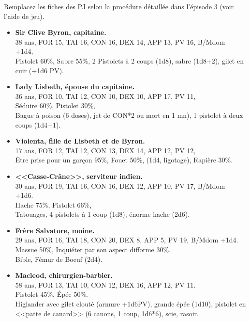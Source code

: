 \documentclass[11pt,twoside,a4paper]{book}
\begin{document}
Remplacez les fiches des PJ selon la proc{\'e}dure d{\'e}taill{\'e}e dans l'{\'e}pisode 3 (voir l'aide de jeu).~\\
\setlength\parindent{20pt}
\begin{itemize}
	\item \textbf{Sir Clive Byron, capitaine. }~\\
	38 ans, FOR 15, TAI 16, CON 16, DEX 14, APP 13, PV 16, B/Mdom +1d4,~\\
	Pistolet 60\%, Sabre 55\%, 2 Pistolets {\`a} 2 coups (1d8), sabre (1d8+2), gilet en cuir (+1d6 PV).
	\item \textbf{Lady Lisbeth, {\'e}pouse du capitaine.}~\\
	36 ans, FOR 10, TAI 12, CON 10, DEX 10, APP 17, PV 11,~\\
	S{\'e}duire 60\%, Pistolet 30\%,~\\
	Bague {\`a} poison (6 doses), jet de CON*2 ou mort en 1 mn), 1 pistolet {\`a} deux coups (1d4+1).
	\item \textbf{Violenta, fille de Lisbeth et de Byron.}~\\
	17 ans, FOR 12, TAI 12, CON 13, DEX 14, APP 12, PV 12,~\\
	{\^E}tre prise pour un gar\c{c}on 95\%, Fouet 50\%, (1d4, ligotage), Rapi{\`e}re 30\%.
	\item \textbf{<<Casse-Cr{\^a}ne>>, serviteur indien.}~\\
	30 ans, FOR 19, TAI 16, CON 16, DEX 12, APP 10, PV 17, B/Mdom +1d6.~\\
	Hache 75\%, Pistolet 66\%,~\\
	Tatouages, 4 pistolets {\`a} 1 coup (1d8), {\'e}norme hache (2d6).
	\item \textbf{Fr{\`e}re Salvatore, moine.}~\\
	29 ans, FOR 16, TAI 18, CON 20, DEX 8, APP 5, PV 19, B/Mdom +1d4.~\\
	Massue 50\%, Inqui{\'e}ter par son aspect difforme 30\%.~\\
	Bible, F{\'e}mur de Boeuf (2d4).
	\item \textbf{Macleod, chirurgien-barbier.}~\\
	58 ans, FOR 13, TAI 10, CON 12, DEX 16, APP 12, PV 11.~\\
	Pistolet 45\%, {\'E}p{\'e}e 50\%.~\\
	Higlander avec gilet clout{\'e} (armure +1d6PV), grande {\'e}p{\'e}e (1d10), pistolet en <<patte de canard>> (6 canons, 1 coup, 1d6*6), scie, rasoir.
\end{itemize}
\setlength\parindent{0pt}
\end{document}
